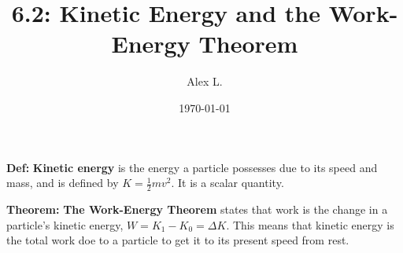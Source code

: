 \documentclass{article}
\title{6.2: Kinetic Energy and the Work-Energy Theorem}
\author{Alex L.}
\date{\today}
\begin{document}
\maketitle

\textbf{Def:} \textbf{Kinetic energy} is the energy a particle possesses due to its speed and mass, and is defined by $K = \frac{1}{2}mv^2$. It is a scalar quantity.

\textbf{Theorem:} \textbf{The Work-Energy Theorem} states that work is the change in a particle's kinetic energy, $W = K_1 - K_0 = \Delta K$. This means that kinetic energy is the total work doe to a particle to get it to its present speed from rest. 
\end{document}
